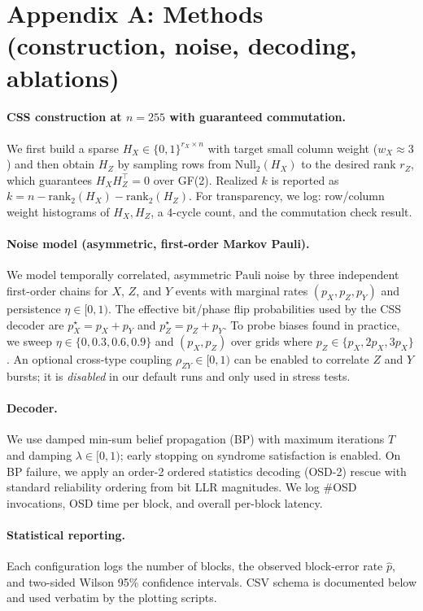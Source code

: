 \appendix
\section*{Appendix A: Methods (construction, noise, decoding, ablations)}

\paragraph{CSS construction at $n=255$ with guaranteed commutation.}
We first build a sparse $H_X\in\{0,1\}^{r_X\times n}$ with target small column weight ($w_X\!\approx\!3$) and then obtain $H_Z$ by sampling rows from $\mathrm{Null}_2(H_X)$ to the desired rank $r_Z$, which guarantees $H_X H_Z^\top=0$ over GF(2).
Realized $k$ is reported as $k = n - \mathrm{rank}_2(H_X) - \mathrm{rank}_2(H_Z)$.
For transparency, we log:
row/column weight histograms of $H_X,H_Z$, a 4-cycle count, and the commutation check result.

\paragraph{Noise model (asymmetric, first-order Markov Pauli).}
We model temporally correlated, asymmetric Pauli noise by three independent first-order chains for $X$, $Z$, and $Y$ events with marginal rates $(p_X,p_Z,p_Y)$ and persistence $\eta\in[0,1)$.
The effective bit/phase flip probabilities used by the CSS decoder are $p_X^\star = p_X + p_Y$ and $p_Z^\star = p_Z + p_Y$.
To probe biases found in practice, we sweep $\eta\in\{0,0.3,0.6,0.9\}$ and $(p_X,p_Z)$ over grids where $p_Z\in\{p_X, 2p_X, 3p_X\}$.
An optional cross-type coupling $\rho_{ZY}\in[0,1)$ can be enabled to correlate $Z$ and $Y$ bursts; it is \emph{disabled} in our default runs and only used in stress tests.

\paragraph{Decoder.}
We use damped min-sum belief propagation (BP) with maximum iterations $T$ and damping $\lambda\in[0,1)$; early stopping on syndrome satisfaction is enabled.
On BP failure, we apply an order-2 ordered statistics decoding (OSD-2) rescue with standard reliability ordering from bit LLR magnitudes.
We log $\#$OSD invocations, OSD time per block, and overall per-block latency.

\paragraph{Statistical reporting.}
Each configuration logs the number of blocks, the observed block-error rate $\hat p$, and two-sided Wilson 95\% confidence intervals.
CSV schema is documented below and used verbatim by the plotting scripts.


